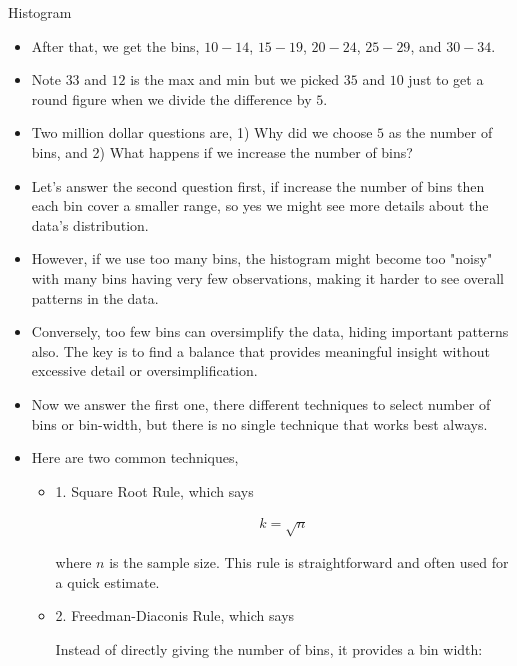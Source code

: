\documentclass[8pt, usepdftitle=false]{beamer}
\begin{document}
\begin{frame}[allowframebreaks]{Histogram}
\begin{itemize}
\item After that, we get the bins, $10-14$, $15-19$, $20-24$, $25-29$, and $30-34$.

\item Note $33$ and $12$ is the max and min but we picked $35$ and $10$ just to get a round figure when we divide the difference by $5$.

\framebreak

\item Two million dollar questions are, 1) Why did we choose $5$ as the number of bins, and 2) What happens if we increase the number of bins? 

\item Let's answer the second question first, if increase the number of bins then each bin cover a smaller range, so yes we might see more details about the data’s distribution. 


\item However, if we use too many bins, the histogram might become too "noisy" with many bins having very few observations, making it harder to see overall patterns in the data. 

\item Conversely, too few bins can oversimplify the data, hiding important patterns also. The key is to find a balance that provides meaningful insight without excessive detail or oversimplification. 


\framebreak


\item Now we answer the first one, there different techniques to select number of bins or bin-width, but there is no single technique that works best always. 

\item Here are two common techniques,


\medskip
\begin{itemize}
  \item 1. Square Root Rule, which says

\begin{align*}
  k=\sqrt{n}
\end{align*}


where $n$ is the sample size. This rule is straightforward and often used for a quick estimate.

\medskip

\item 2. Freedman-Diaconis Rule, which says

Instead of directly giving the number of bins, it provides a bin width:


\end{itemize}
\end{itemize}
\end{frame}
\end{document}
